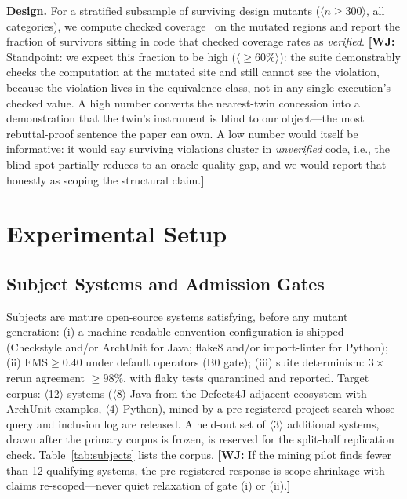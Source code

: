 \documentclass[conference]{IEEEtran}
\newcommand{\ph}[1]{\colorbox{yellow!35}{\small$\langle$\textsf{#1}$\rangle$}}
\newcommand{\wj}[1]{{\color{blue}\footnotesize\textbf{[WJ:} #1\textbf{]}}}
\newcommand{\fms}{\mathrm{FMS}}
\begin{document}
\textbf{Design.} For a stratified subsample of surviving design mutants (\ph{$n\geq$300}, all categories), we compute checked coverage~\cite{schuler2011checked} on the mutated regions and report the fraction of survivors sitting in code that checked coverage rates as \emph{verified}. \wj{Standpoint: we expect this fraction to be high (\ph{$\geq$60\%}): the suite demonstrably checks the computation at the mutated site and still cannot see the violation, because the violation lives in the equivalence class, not in any single execution's checked value. A high number converts the nearest-twin concession into a demonstration that the twin's instrument is blind to our object---the most rebuttal-proof sentence the paper can own. A low number would itself be informative: it would say surviving violations cluster in \emph{unverified} code, i.e., the blind spot partially reduces to an oracle-quality gap, and we would report that honestly as scoping the structural claim.}

\section{Experimental Setup}\label{sec:setup}

\subsection{Subject Systems and Admission Gates}\label{sec:subjects}

Subjects are mature open-source systems satisfying, before any mutant generation: (i) a machine-readable convention configuration is shipped (Checkstyle and/or ArchUnit for Java; flake8 and/or import-linter for Python); (ii) $\fms \geq 0.40$ under default operators (B0 gate); (iii) suite determinism: $3\times$ rerun agreement $\geq 98\%$, with flaky tests quarantined and reported. Target corpus: \ph{12} systems (\ph{8} Java from the Defects4J-adjacent ecosystem with ArchUnit examples, \ph{4} Python), mined by a pre-registered project search whose query and inclusion log are released. A held-out set of \ph{3} additional systems, drawn after the primary corpus is frozen, is reserved for the split-half replication check. Table~\ref{tab:subjects} lists the corpus. \wj{If the mining pilot finds fewer than 12 qualifying systems, the pre-registered response is scope shrinkage with claims re-scoped---never quiet relaxation of gate (i) or (ii).}
\end{document}
